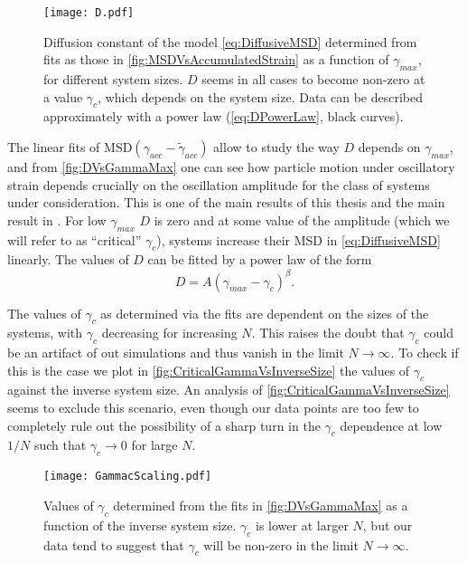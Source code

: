 \begin{figure}[!h] 
\centering 
\texttt{[image: D.pdf]} 
\caption{Diffusion constant of the model \autoref{eq:DiffusiveMSD} determined from fits as those in \autoref{fig:MSDVsAccumulatedStrain} as a function of $\gamma_{max}$, for different system sizes. $D$ seems in all cases to become non-zero at a value $\gamma_{c}$, which depends on the system size. Data can be described approximately with a power law (\autoref{eq:DPowerLaw}, black curves). \label{fig:DVsGammaMax}}
\end{figure}
The linear fits of $\text{MSD} (\gamma_{acc} - \widetilde{\gamma}_{acc})$ allow to study the way $D$ depends on $\gamma_{max}$, and from \autoref{fig:DVsGammaMax} one can see how particle motion under oscillatory strain depends crucially on the oscillation amplitude for the class of systems under consideration. This is one of the main results of this thesis and the main result in \cite{fiocco2013oscillatory}. For low $\gamma_{max}$ $D$ is zero and at some value of the amplitude (which we will refer to as ``critical'' $\gamma_{c}$), systems increase their MSD in \autoref{eq:DiffusiveMSD} linearly. The values of $D$ can be fitted by a power law of the form
\begin{equation}
	D = A (\gamma_{max} - \gamma_{c})^{\beta}. 
	\label{eq:DPowerLaw}
\end{equation}

The values of $\gamma_{c}$ as determined via the fits are dependent on the sizes of the systems, with $\gamma_{c}$ decreasing for increasing $N$. This raises the doubt that $\gamma_{c}$ could be an artifact of out simulations and thus vanish in the limit $N \rightarrow \infty$. To check if this is the case we plot in \autoref{fig:CriticalGammaVsInverseSize} the values of $\gamma_{c}$ against the inverse system size. An analysis of \autoref{fig:CriticalGammaVsInverseSize} seems to exclude this scenario, even though our data points are too few to completely rule out the possibility of a sharp turn in the $\gamma_{c}$ dependence at low $1/N$ such that $\gamma_{c} \rightarrow 0$ for large $N$.

\begin{figure}[!h] 
\centering 
\texttt{[image: GammacScaling.pdf]} 
\caption{Values of $\gamma_{c}$ determined from the fits in \autoref{fig:DVsGammaMax} as a function of the inverse system size. $\gamma_{c}$ is lower at larger $N$, but our data tend to suggest that $\gamma_{c}$ will be non-zero in the limit $N \to \infty$. \label{fig:CriticalGammaVsInverseSize}}
\end{figure}

